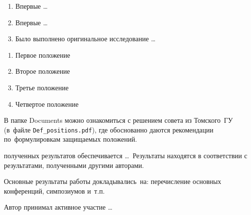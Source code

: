 \begin{enumerate}[beginpenalty=10000] %
  \item Впервые \ldots
  \item Впервые \ldots
  \item Было выполнено оригинальное исследование \ldots
\end{enumerate}

{}
\begin{enumerate}[beginpenalty=10000] %
  \item Первое положение
  \item Второе положение
  \item Третье положение
  \item Четвертое положение
\end{enumerate}
В папке Documents можно ознакомиться с решением совета из Томского~ГУ
(в~файле \verb+Def_positions.pdf+), где обоснованно даются рекомендации
по~формулировкам защищаемых положений.

{\reliability} полученных результатов обеспечивается \ldots \ Результаты находятся в соответствии с результатами, полученными другими авторами.


{\probation}
Основные результаты работы докладывались~на:
перечисление основных конференций, симпозиумов и~т.\:п.

{\contribution} Автор принимал активное участие \ldots

